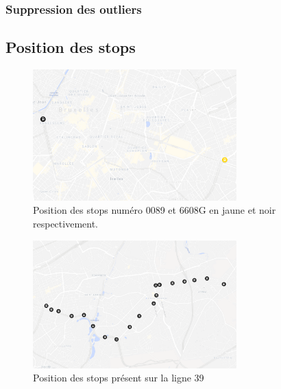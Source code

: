 \documentclass[12pt]{report}
\begin{document}
\subsection{Suppression des outliers}

\begin{appendices}
    \chapter{Position des stops}
    \begin{figure}[h]
        \centering
        \includegraphics[width=0.7\textwidth]{images/stop_pos_1.png}
        \caption{Position des stops numéro 0089 et 6608G en jaune et noir respectivement.}
        \label{appendix:stop_pos_1}
    \end{figure}

    \begin{figure}[h]
        \centering
        \includegraphics[width=0.7\textwidth]{images/stop_pos_2.png}
        \caption{Position des stops présent sur la ligne 39}
        \label{appendix:stop_pos_2}
    \end{figure}


\end{appendices}
\end{document}
